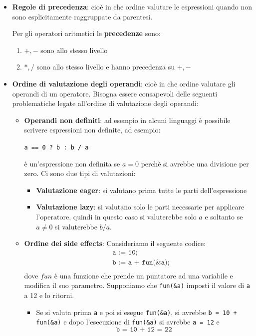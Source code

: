\documentclass[a4paper]{article}
\begin{document}
\begin{itemize}
  \item \textbf{Regole di precedenza}: cioè in che ordine valutare le espressioni
    quando non sono esplicitamente raggruppate da parentesi.

    Per gli operatori aritmetici le \textbf{precedenze} sono:
    \begin{enumerate}
      \item \( +, - \) sono allo stesso livello
      \item \( *, / \) sono allo stesso livello e hanno precedenza su \( +, - \)
    \end{enumerate}

   \item \textbf{Ordine di valutazione degli operandi}: cioè in che ordine valutare
      gli operandi di un operatore. Bisogna essere consapevoli delle seguenti
      problematiche legate all'ordine di valutazione degli operandi:
      \begin{itemize}
        \item \textbf{Operandi non definiti}: ad esempio in alcuni linguaggi è
          possibile scrivere espressioni non definite, ad esempio:
          \begin{center}
            \texttt{a == 0 ? b : b / a}
          \end{center}
          è un'espressione non definita se \( a = 0 \)
          perchè si avrebbe una divisione per zero. Ci sono due tipi di valutazioni:
          \begin{itemize}
            \item \textbf{Valutazione eager}: si valutano prima tutte le parti
              dell'espressione

            \item \textbf{Valutazione lazy}: si valutano solo le parti necessarie
              per applicare l'operatore, quindi in questo caso si valuterebbe solo
              \( a \) e soltanto se \( a \neq 0 \) si valuterebbe \( b / a \).
          \end{itemize}

        \item \textbf{Ordine dei side effects}: Consideriamo il seguente codice:
          \[
            \begin{aligned}
                &\texttt{a := 10;} \\
                &\texttt{b := a + fun(\&a);} \\
            \end{aligned}
          \] 
          dove \( fun \) è una funzione che prende un puntatore ad una variabile
          e modifica il suo parametro. Supponiamo che \texttt{fun(\&a)} imposti
          il valore di \texttt{a} a 12 e lo ritorni.
          \begin{itemize}
            \item Se si valuta prima \texttt{a} e poi si esegue \texttt{fun(\&a)},
            si avrebbe \texttt{b = 10 + fun(\&a)} e dopo l'esecuzione di
            \texttt{fun(\&a)} si avrebbe \texttt{a = 12} e
            \[
              \texttt{b = 10 + 12 = 22}
            \] 


\end{itemize}
\end{itemize}
\end{itemize}
\end{document}

